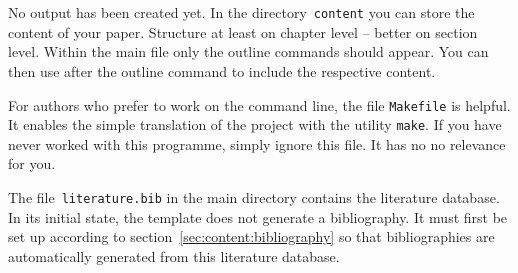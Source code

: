 No output has been created yet. In the directory~\texttt{content} you can store the
content of your paper. Structure at least on chapter level -- better on section
level. Within the main file only the outline commands should appear. You can
then use \verb++ after the outline command to include the respective
content.

For authors who prefer to work on the command line, the file \texttt{Makefile} is
helpful. It enables the simple translation of the project with the utility
\texttt{make}. If you have never worked with this programme, simply ignore this file.
It has no no relevance for you.

The file~\texttt{literature.bib} in the main directory contains the literature database.
In its initial state, the template does not generate a bibliography.
It must first be set up according to section~\ref{sec:content:bibliography} so
that bibliographies are automatically generated from this literature database.
